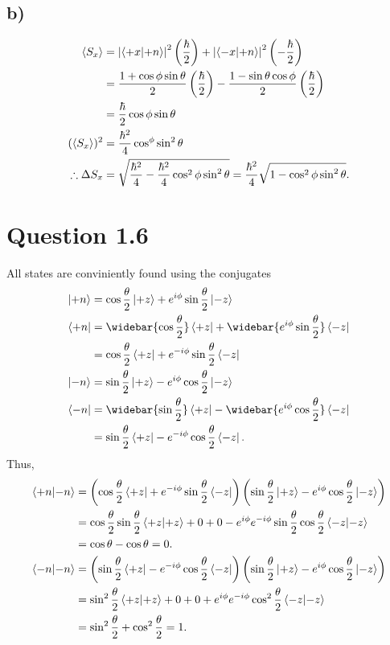 \documentclass[
	12pt,
	]{article}
\newcommand{\la}{\langle}
\newcommand{\ra}{\rangle}
\theoremstyle{definition}
\theoremstyle{definition}
\theoremstyle{definition}
\theoremstyle{definition}
\theoremstyle{definition}
\theoremstyle{example}
\theoremstyle{note}
\theoremstyle{remark}
\theoremstyle{example}
\begin{document}
						\subsection*{b) }
							\begin{align*}
								\la S_{x} \ra  &= \abs{\braket{+x}{+n}}^{2} \left(\frac{\hbar}{2}\right) + \abs{\braket{-x}{+n}}^{2}\left(-\frac{\hbar}{2}\right) \\
								&= \frac{1+\cos\phi \sin \theta}{2} \left(\frac{\hbar}{2}\right) - \frac{1-\sin\theta\cos\phi}{2} \left(\frac{\hbar}{2}\right)\\
								&= \frac{\hbar}{2} \cos\phi \sin \theta \\
								(\la S_{x} \ra)^{2} &=\frac{\hbar^{2}}{4} \cos^{\phi} \sin^{2}\theta \\
								\therefore \Delta S_{x} &= \sqrt{\frac{\hbar^{2}}{4} - \frac{\hbar^{2}}{4} \cos^{2}\phi \sin^{2}\theta} = \frac{\hbar^{2}}{4}\sqrt{1-\cos^{2}\phi \sin^{2}\theta}.
							\end{align*}
						\section*{Question 1.6}
							All states are conviniently found using the conjugates 
							\begin{align*}
								\ket{+n} &= \cos \frac{\theta}{2} \ket{+z} + e^{i\phi }\sin \frac{\theta}{2} \ket{-z} \\
								\bra{+n} &= \widebar{\cos \frac{\theta}{2}} \bra{+z} + \widebar{e^{i\phi }\sin \frac{\theta}{2}}  \bra{-z} \\
								&= \cos \frac{\theta}{2} \bra{+z} + e^{-i \phi }\sin \frac{\theta}{2} \bra{-z} \\
								\ket{-n} &= \sin \frac{\theta}{2} \ket{+z} - e^{i\phi }\cos \frac{\theta}{2} \ket{-z} \\
								\bra{-n} &= \widebar{\sin \frac{\theta}{2}} \bra{+z} - \widebar{e^{i\phi }\cos \frac{\theta}{2}}\bra{-z} \\
								&= \sin \frac{\theta}{2} \bra{+z} - e^{-i \phi } \cos \frac{\theta}{2} \bra{-z}. 
							\end{align*}
							Thus, 
							\begin{align*}
								\braket{+n}{-n} &= \left(\cos \frac{\theta}{2} \bra{+z} + e^{-i \phi }\sin \frac{\theta}{2} \bra{-z}\right)\left(\sin \frac{\theta}{2} \ket{+z} - e^{i\phi }\cos \frac{\theta}{2} \ket{-z}\right) \\
								&= \cos \frac{\theta}{2} \sin \frac{\theta}{2} \braket{+z}{+z} +0 +0 - e^{i\phi }e^{-i \phi} \sin \frac{\theta}{2} \cos \frac{\theta}{2} \braket{-z}{-z} \\
								&= \cos\theta - \cos \theta = 0. \\
								\braket{-n}{-n} &= \left(\sin \frac{\theta}{2} \bra{+z} - e^{-i \phi } \cos \frac{\theta}{2} \bra{-z}\right)\left(\sin \frac{\theta}{2} \ket{+z} - e^{i\phi }\cos \frac{\theta}{2} \ket{-z}\right) \\
								&= \sin^{2}\frac{\theta}{2} \braket{+z}{+z} +0 +0 + e^{i \phi }e^{-i \phi }\cos^{2}\frac{\theta}{2} \braket{-z}{-z} \\ 
								&= \sin^{2}\frac{\theta}{2} + \cos^{2} \frac{\theta}{2} = 1.
							\end{align*}
\end{document}
